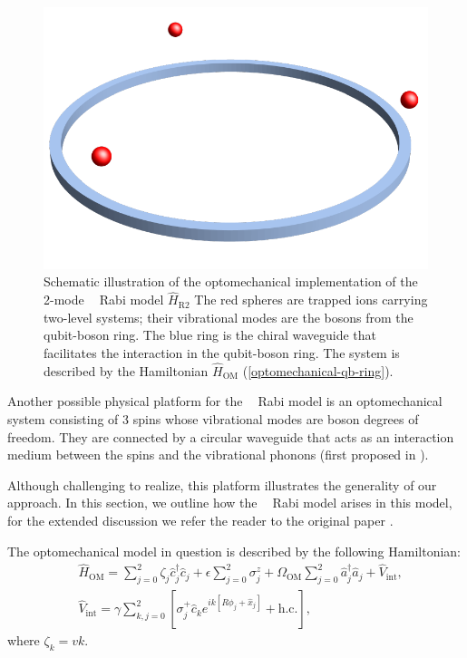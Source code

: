 \documentclass[reprint, aps, prx, amsmath, amssymb, longbibliography, superscriptaddress]{revtex4-2}
\DeclareMathOperator{\Zthree}{\mathbb{Z}_3}
\begin{document}
\begin{figure}
    \includegraphics[width=0.8\linewidth]{pics/optomechanical_Rabi_pic.pdf}
    \caption{Schematic illustration of the optomechanical implementation of the 2-mode $\Zthree$ Rabi model $\hat H_{\text{R}2}$ \cite{sedov_chiral_2020} The red spheres are trapped ions carrying two-level systems; their vibrational modes are the bosons from the qubit-boson ring. The blue ring is the chiral waveguide that facilitates the interaction in the qubit-boson ring. The system is described by the Hamiltonian $\hat H_{\text{OM}}$ (\ref{optomechanical-qb-ring}).}
    \label{fig:optomechanical-rabi}
\end{figure}

Another possible physical platform for the $\Zthree$ Rabi model is an optomechanical system consisting of 3 spins whose vibrational modes are boson degrees of freedom. They are connected by a circular waveguide that acts as an interaction medium between the spins and the vibrational phonons (first proposed in \cite{sedov_chiral_2020}). 

Although challenging to realize, this platform illustrates the generality of our approach. In this section, we outline how the $\Zthree$ Rabi model arises in this model, for the extended discussion we refer the reader to the original paper \cite{sedov_chiral_2020}. 

The optomechanical model in question is described by the following Hamiltonian:
\begin{equation}
\label{optomechanical-qb-ring}
\begin{aligned}
    &\hat{H}_{\text{OM}}=\sum\limits_{j=0}^2 \zeta_j \hat{c}_j^{\dagger} \hat{c}_j + 
 \epsilon \sum_{j=0}^2 \sigma_j^z + \Omega_{\text{OM}} \sum_{j=0}^2 \hat{a}_j^{\dagger} \hat{a}_j + \hat{V}_{\text{int}}, \\
    &\hat{V}_{\text{int}}=\gamma \sum_{k, j=0}^2 \left[\sigma_j^{+} \hat{c}_k e^{i k\left[R \phi_j+\hat x_j\right]}+\text {h.c.}\right] \text {, }
\end{aligned}   
\end{equation}
where $\zeta_k = v k$.
\end{document}
